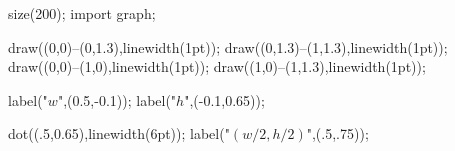 	size(200);  
    import graph;
    
    draw((0,0)--(0,1.3),linewidth(1pt));
    draw((0,1.3)--(1,1.3),linewidth(1pt));
    draw((0,0)--(1,0),linewidth(1pt));
    draw((1,0)--(1,1.3),linewidth(1pt));
    
    label("$w$",(0.5,-0.1));
    label("$h$",(-0.1,0.65));
    
    dot((.5,0.65),linewidth(6pt));
    label("$(w/2,h/2)$",(.5,.75));